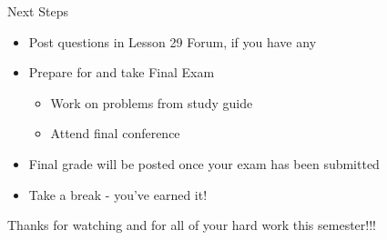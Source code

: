 \documentclass[t]{beamer}
\begin{document}
	\begin{frame}{Next Steps}
		\begin{itemize}
			\item Post questions in Lesson 29 Forum, if you have any
			\item Prepare for and take Final Exam
			\begin{itemize}
				\item Work on problems from study guide
				\item Attend final conference
			\end{itemize}
			\item Final grade will be posted once your exam has been submitted
			\item Take a break - you've earned it!
		\end{itemize}
	
		\vfill
		
		Thanks for watching and for all of your hard work this semester!!!
	\end{frame}
	
\end{document}
